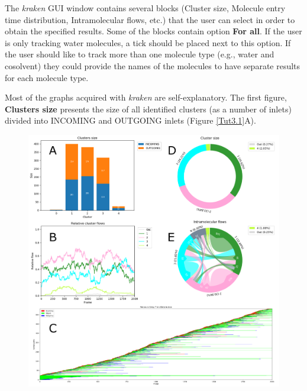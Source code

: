 \documentclass[9pt,tutorial]{livecoms}
\begin{document}
The \textit{kraken} GUI window contains several blocks (Cluster size, Molecule entry time distribution, Intramolecular flows, etc.) that the user can select in order to obtain the specified results. Some of the blocks contain option \textbf{For all}. If the user is only tracking water molecules, a tick should be placed next to this option. If the user should like to track more than one molecule type (e.g., water and cosolvent) they could provide the names of the molecules to have separate results for each molecule type. 

Most of the graphs acquired with \textit{kraken} are self-explanatory. 
The first figure, \textbf{Clusters size} presents the size of all identified clusters (as a number of inlets) divided into INCOMING and OUTGOING inlets (Figure \ref{Tut3.1}A).

\begin{figure}[hptb!]
\centering
\includegraphics[width=\textwidth]{Tut3.1.png}

\end{figure}
\end{document}
